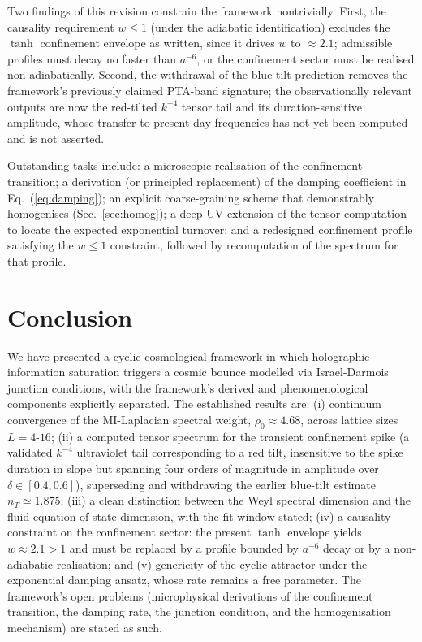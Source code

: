 \documentclass[reprint,superscriptaddress,amsmath,amssymb,aps,prd,showkeys,nofootinbib]{revtex4-2}
\begin{document}
Two findings of this revision constrain the framework nontrivially. First, the causality
requirement $w\leq1$ (under the adiabatic identification) excludes the $\tanh$ confinement
envelope as written, since it drives $w$ to $\approx2.1$; admissible profiles must decay no
faster than $a^{-6}$, or the confinement sector must be realised non-adiabatically.
Second, the withdrawal of the blue-tilt prediction removes the framework's previously
claimed PTA-band signature; the observationally relevant outputs are now the red-tilted
$k^{-4}$ tensor tail and its duration-sensitive amplitude, whose transfer to present-day
frequencies has not yet been computed and is not asserted.

Outstanding tasks include: a microscopic realisation of the confinement transition; a
derivation (or principled replacement) of the damping coefficient in
Eq.~(\ref{eq:damping}); an explicit coarse-graining scheme that demonstrably homogenises
(Sec.~\ref{sec:homog}); a deep-UV extension of the tensor computation to locate the
expected exponential turnover; and a redesigned confinement profile satisfying the
$w\leq1$ constraint, followed by recomputation of the spectrum for that profile.

\section{Conclusion}

We have presented a cyclic cosmological framework in which holographic information
saturation triggers a cosmic bounce modelled via Israel-Darmois junction conditions, with
the framework's derived and phenomenological components explicitly separated. The
established results are: (i) continuum convergence of the MI-Laplacian spectral weight,
$\rho_0\approx4.68$, across lattice sizes $L=4$-$16$; (ii) a computed tensor spectrum for
the transient confinement spike (a validated $k^{-4}$ ultraviolet tail corresponding to
a red tilt, insensitive to the spike duration in slope but spanning four orders of
magnitude in amplitude over $\delta\in[0.4,0.6]$), superseding and withdrawing the
earlier blue-tilt estimate $n_T\simeq1.875$; (iii) a clean distinction between the Weyl
spectral dimension and the fluid equation-of-state dimension, with the fit window stated;
(iv) a causality constraint on the confinement sector: the present $\tanh$ envelope yields
$w\approx2.1>1$ and must be replaced by a profile bounded by $a^{-6}$ decay or by a
non-adiabatic realisation; and (v) genericity of the cyclic attractor under the exponential
damping ansatz, whose rate remains a free parameter. The framework's open problems
(microphysical derivations of the confinement transition, the damping rate, the junction
condition, and the homogenisation mechanism) are stated as such.
\end{document}

